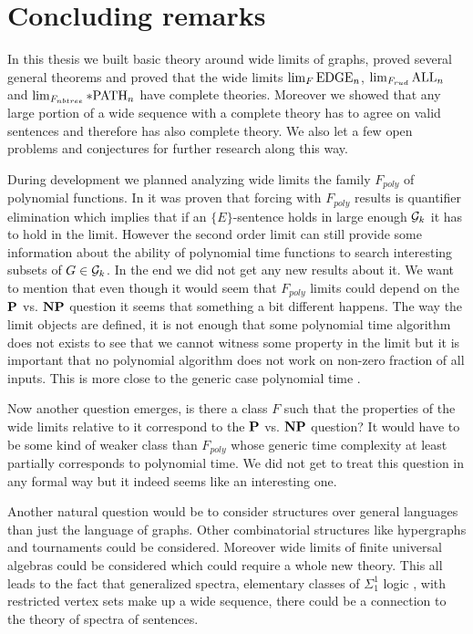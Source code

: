 \chapter*{Concluding remarks}

In this thesis we built basic theory around wide limits of graphs, proved several general theorems and proved that the wide limits $\lim_F\EDGE_n$, $\lim_{F_{rud}}\ALL_n$ and $\lim_{F_{nbtree}}\pPATH_n$ have complete theories. Moreover we showed that any large portion of a wide sequence with a complete theory has to agree on valid sentences and therefore has also complete theory. We also let a few open problems and conjectures for further research along this way.

During development we planned analyzing wide limits the family $F_{poly}$ of polynomial functions. In \cite{krajicek2010forcing} it was proven that forcing with $F_{poly}$ results is quantifier elimination which implies that if an $\{E\}$-sentence holds in large enough $\G_k$ it has to hold in the limit. However the second order limit can still provide some information about the ability of polynomial time functions to search interesting subsets of $G\in\G_k$. In the end we did not get any new results about it. We want to mention that even though it would seem that $F_{poly}$ limits could depend on the $\P$ vs. $\NP$ question it seems that something a bit different happens. The way the limit objects are defined, it is not enough that some polynomial time algorithm does not exists to see that we cannot witness some property in the limit but it is important that no polynomial algorithm does not work on non-zero fraction of all inputs. This is more close to the generic case polynomial time \cite{gilman2007report}.

Now another question emerges, is there a class $F$ such that the properties of the wide limits relative to it correspond to the $\P$ vs. $\NP$ question? It would have to be some kind of weaker class than $F_{poly}$ whose generic time complexity at least partially corresponds to polynomial time. We did not get to treat this question in any formal way but it indeed seems like an interesting one.

Another natural question would be to consider structures over general languages than just the language of graphs. Other combinatorial structures like hypergraphs and tournaments could be considered. Moreover wide limits of finite universal algebras could be considered which could require a whole new theory. This all leads to the fact that generalized spectra, elementary classes of $\Sigma_1^1$ logic \cite{Fagin74}, with restricted vertex sets make up a wide sequence, there could be a connection to the theory of spectra of sentences.
